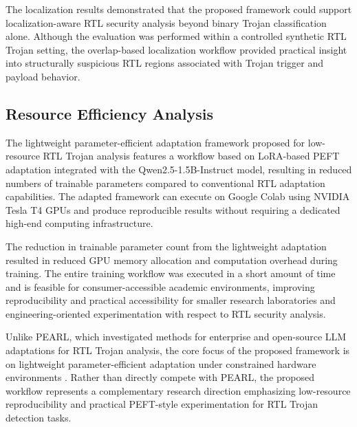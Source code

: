 \documentclass[conference]{IEEEtran}
\begin{document}
The localization results demonstrated that the proposed framework could support localization-aware RTL security analysis beyond binary Trojan classification alone. Although the evaluation was performed within a controlled synthetic RTL Trojan setting, the overlap-based localization workflow provided practical insight into structurally suspicious RTL regions associated with Trojan trigger and payload behavior.


\subsection{Resource Efficiency Analysis}
\label{subsec:resource_efficiency}

The lightweight parameter-efficient adaptation framework proposed for low-resource RTL Trojan analysis features a workflow based on LoRA-based PEFT adaptation integrated with the Qwen2.5-1.5B-Instruct model, resulting in reduced numbers of trainable parameters compared to conventional RTL adaptation capabilities. The adapted framework can execute on Google Colab using NVIDIA Tesla T4 GPUs and produce reproducible results without requiring a dedicated high-end computing infrastructure.

The reduction in trainable parameter count from the lightweight adaptation resulted in reduced GPU memory allocation and computation overhead during training. The entire training workflow was executed in a short amount of time and is feasible for consumer-accessible academic environments, improving reproducibility and practical accessibility for smaller research laboratories and engineering-oriented experimentation with respect to RTL security analysis.

Unlike PEARL, which investigated methods for enterprise and open-source LLM adaptations for RTL Trojan analysis, the core focus of the proposed framework is on lightweight parameter-efficient adaptation under constrained hardware environments \cite{kundu2025pearl,lora,qlora}. Rather than directly compete with PEARL, the proposed workflow represents a complementary research direction emphasizing low-resource reproducibility and practical PEFT-style experimentation for RTL Trojan detection tasks.
\end{document}
